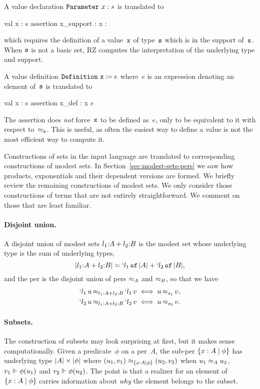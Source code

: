 A value declaration $\iParameter{x}{s}$ is translated to
%
\begin{source}
val x : s
assertion x_support : x : 
\end{source}
%
which requires the definition of a value~$\f{x}$ of type~$\f{s}$ which is in
the support of~$\f{s}$.
\iflong
When $\f{s}$ is not a basic set, RZ computes the
interpretation of the underlying type and support.
\fi

A value definition $\iDefinition{\f{x}}{e}$ where~$e$ is an expression
denoting an element of~$\f{s}$ is translated to
%
\newcommand{\iE}{$e$}
\begin{source}
val x : s
assertion x_def : x  \iE
\end{source}
%
The assertion does \emph{not} force~$\f{x}$ to be defined as~$e$, only
to be equivalent to it with respect to~$\per_{\f{s}}$. This is
useful, as often the easiest way to define a value is not the most
efficient way to compute it.

Constructions of sets in the input language are translated to
corresponding constructions of modest sets.
%
\iflong
In Section~\ref{sec:modest-sets-pers} we saw how products,
exponentials and their dependent versions are formed. We briefly
review the remaining constructions of modest sets. We only consider
those constructions of terms that are not entirely straightforward.
%
\else
%
We comment on those that are least familiar.
%
\fi

\iflong
\paragraph{Disjoint union.}
%
A disjoint union of modest sets $\isum{\il_1}{A}{\il_2}{B}$ is the
modest set whose underlying type is the sum of underlying types,
%
\begin{equation*}
  \typeOf{\isum{\il_1}{A}{\il_2}{B}} =
  \osumtyx{\il_1}{\typeOf{A}}{\il_2}{\typeOf{B}},
\end{equation*}
%
and the per is the disjoint union of pers $\per_{A}$ and $\per_{B}$, so
that we have
%
\begin{align*}
  \oper{\isum{\il_1}{A}{\il_2}{B}}{\oinj{\il_1}{u}}{\oinj{\il_1}{v}}
  &\iff \oper{s_1}{u}{v},
  \\
  \oper{\isum{\il_1}{A}{\il_2}{B}}{\oinj{\il_2}{u}}{\oinj{\il_2}{v}}
  &\iff \oper{s_2}{u}{v}.
\end{align*}
\fi %

\paragraph{Subsets.}
%
\iflong
%
The construction of subsets may look surprising at first, but
it makes sense computationally.
\fi
Given a predicate~$\phi$ on a per~$A$, the sub-per $\set{x : A
  \such \phi}$ has underlying type $\typeOf{A} \times \typeOf{\phi}$
where $(u_1,v_1) \per_{\set{x : A \such \phi}} (u_2,v_2)$ when $u_1
\per_A u_2$, $v_1 \rz \phi(u_1)$ and $v_2 \rz \phi(u_2)$. The point is
that a realizer for an element of $\set{x : A
  \such \phi}$ carries information about \emph{why} the element
belongs to the subset.

